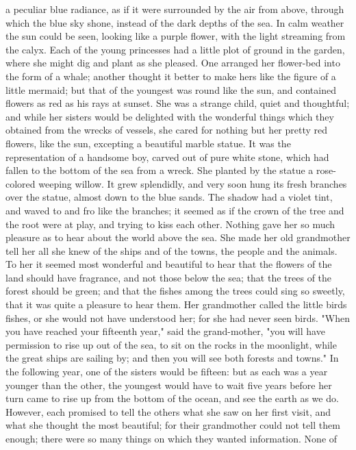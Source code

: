 a peculiar blue radiance, as if it were surrounded by the air from
above, through which the blue sky shone, instead of the dark depths of
the sea. In calm weather the sun could be seen, looking like a
purple flower, with the light streaming from the calyx. Each of the
young princesses had a little plot of ground in the garden, where
she might dig and plant as she pleased. One arranged her flower-bed
into the form of a whale; another thought it better to make hers
like the figure of a little mermaid; but that of the youngest was
round like the sun, and contained flowers as red as his rays at
sunset. She was a strange child, quiet and thoughtful; and while her
sisters would be delighted with the wonderful things which they
obtained from the wrecks of vessels, she cared for nothing but her
pretty red flowers, like the sun, excepting a beautiful marble statue.
It was the representation of a handsome boy, carved out of pure
white stone, which had fallen to the bottom of the sea from a wreck.
She planted by the statue a rose-colored weeping willow. It grew
splendidly, and very soon hung its fresh branches over the statue,
almost down to the blue sands. The shadow had a violet tint, and waved
to and fro like the branches; it seemed as if the crown of the tree
and the root were at play, and trying to kiss each other. Nothing gave
her so much pleasure as to hear about the world above the sea. She
made her old grandmother tell her all she knew of the ships and of the
towns, the people and the animals. To her it seemed most wonderful and
beautiful to hear that the flowers of the land should have
fragrance, and not those below the sea; that the trees of the forest
should be green; and that the fishes among the trees could sing so
sweetly, that it was quite a pleasure to hear them. Her grandmother
called the little birds fishes, or she would not have understood
her; for she had never seen birds.
    "When you have reached your fifteenth year," said the
grand-mother, "you will have permission to rise up out of the sea,
to sit on the rocks in the moonlight, while the great ships are
sailing by; and then you will see both forests and towns."
    In the following year, one of the sisters would be fifteen: but as
each was a year younger than the other, the youngest would have to
wait five years before her turn came to rise up from the bottom of the
ocean, and see the earth as we do. However, each promised to tell
the others what she saw on her first visit, and what she thought the
most beautiful; for their grandmother could not tell them enough;
there were so many things on which they wanted information. None of
